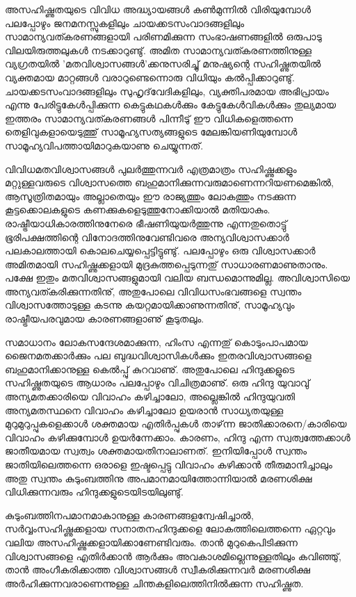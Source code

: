 ﻿

\vskip 2pt

അസഹിഷ്ണുതയുടെ വിവിധ അദ്ധ്യായങ്ങള്‍ കണ്‍മുന്നില്‍ വിരിയുമ്പോള്‍ പലപ്പോഴും ജനമനസ്സുകളിലും ചായക്കടസംവാദങ്ങളിലും 
സാമാന്യവത്കരണങ്ങളായി പരിണമിക്കുന്ന സംഭാഷണങ്ങളില്‍ ഒരുപാടു വിലയിരുത്തലുകള്‍ നടക്കാറുണ്ടു്. അമിത സാമാന്യവത്കരണത്തിനുള്ള
 വ്യഗ്രതയില്‍ 'മതവിശ്വാസങ്ങള്‍'ക്കനുസരിച്ചു് മനുഷ്യന്റെ സഹിഷ്ണുതയില്‍ വ്യക്തമായ മാറ്റങ്ങള്‍ വരാറുണ്ടെന്നൊരു വിധിയും കല്‍പ്പിക്കാറുണ്ടു്. 
 ചായക്കടസംവാദങ്ങളിലും സുഹൃദ്‌വേദികളിലും, വ്യക്തിപരമായ അഭിപ്രായം എന്നു പേരിട്ടുകേള്‍പ്പിക്കുന്ന കെട്ടുകഥകള്‍ക്കും കേട്ടുകേള്‍വികള്‍ക്കും
  തുല്യമായ ഇത്തരം സാമാന്യവത്കരണങ്ങള്‍ പിന്നീടു് ഈ വിധികളെത്തന്നെ തെളിവുകളായെടുത്തു് സാമൂഹ്യസത്യങ്ങളുടെ 
  മേലങ്കിയണിയുമ്പോള്‍ സാമൂഹ്യവിപത്തായിമാറുകയാണു ചെയ്യുന്നത്.

വിവിധമതവിശ്വാസങ്ങള്‍ പുലര്‍ത്തുന്നവര്‍ എത്രമാത്രം സഹിഷ്ണുക്കളും മറ്റുള്ളവരുടെ വിശ്വാസത്തെ ബഹുമാനിക്കുന്നവരുമാണെന്നറിയണമെങ്കില്‍, 
ആസൂത്രിതമായും അല്ലാതെയും ഈ രാജ്യത്തും ലോകത്തും നടക്കുന്ന കൂട്ടക്കൊലകളുടെ കണക്കുകളെടുത്തുനോക്കിയാല്‍ മതിയാകും. 
രാഷ്ട്രീയാധികാരത്തിനുനേരെ ഭീഷണിയുയര്‍ത്തുന്നു എന്നതുതൊട്ടു് ഭൂരിപക്ഷത്തിന്റെ വിനോദത്തിനുവേണ്ടിവരെ അന്യവിശ്വാസക്കാര്‍ 
പലകാലത്തായി കൊലചെയ്യപ്പെട്ടിട്ടുണ്ടു്. പലപ്പോഴും ഒരു വിശ്വാസക്കാര്‍ അമിതമായി സഹിഷ്ണുക്കളായി മുദ്രകുത്തപ്പെടുന്നതു് സാധാരണമാണുതാനും. 
പക്ഷേ ഇതും മതവിശ്വാസങ്ങളുമായി വലിയ ബന്ധമൊന്നുമില്ല. അവിശ്വാസിയെ അന്യവത്കരിക്കുന്നതിനു്, അതുപോലെ 
വിവിധസംഭവങ്ങളെ സ്വന്തം വിശ്വാസത്തോടുള്ള കടന്നു കയറ്റമായിക്കാണുന്നതിനു്, സാമൂഹ്യവും രാഷ്ട്രീയപരവുമായ കാരണങ്ങളാണു് കൂടുതലും.

സമാധാനം ലോകസന്ദേശമാക്കുന്ന, ഹിംസ എന്നതു് കൊടുംപാപമായ ജൈനമതക്കാര്‍ക്കും പല ബുദ്ധവിശ്വാസികള്‍ക്കും 
ഇതരവിശ്വാസങ്ങളെ ബഹുമാനിക്കാനുള്ള കെല്‍പ്പു് കുറവാണു്. അതുപോലെ ഹിന്ദുക്കളുടെ സഹിഷ്ണുതയുടെ ആധാരം പലപ്പോഴും 
വിചിത്രമാണു്. ഒരു ഹിന്ദു യുവാവു് അന്യമതക്കാരിയെ വിവാഹം കഴിച്ചാലോ, അല്ലെങ്കില്‍ ഹിന്ദുയുവതി അന്യമതസ്ഥനെ വിവാഹം 
കഴിച്ചാലോ ഉയരാന്‍ സാധ്യതയുള്ള മുറുമുറുപ്പുകളെക്കാള്‍ ശക്തമായ എതിര്‍പ്പുകള്‍ താഴ്‌ന്ന ജാതിക്കാരനെ/കാരിയെ വിവാഹം 
കഴിക്കുമ്പോള്‍ ഉയര്‍ന്നേക്കാം. കാരണം, ഹിന്ദു എന്ന സ്വത്വത്തേക്കാള്‍ ജാതീയമായ സ്വത്വം ശക്തമായതിനാലാണത്. 
ഇനിയിപ്പോള്‍ സ്വന്തം ജാതിയിലെത്തന്നെ ഒരാളെ ഇഷ്ടപ്പെട്ടു വിവാഹം കഴിക്കാന്‍ തീരുമാനിച്ചാലും അതു സ്വന്തം 
കുടുംബത്തിനു അപമാനമായിത്തോന്നിയാല്‍ മരണശിക്ഷ വിധിക്കുന്നവരും ഹിന്ദുക്കളുടെയിടയിലുണ്ടു്.

കുടുംബത്തിനപമാനമാകാനുള്ള കാരണങ്ങളന്വേഷിച്ചാല്‍, സര്‍വ്വംസഹിഷ്ണുക്കളായ സനാതനഹിന്ദുക്കളെ ലോകത്തിലെത്തന്നെ
 ഏറ്റവും വലിയ അസഹിഷ്ണുക്കളായിക്കാണേണ്ടിവരും. താന്‍ മുറുകെപിടിക്കുന്ന വിശ്വാസങ്ങളെ എതിര്‍ക്കാന്‍ ആര്‍ക്കും അവകാശമില്ലെന്നുള്ളതിലും 
 കവിഞ്ഞു്, താന്‍ അംഗീകരിക്കാത്ത വിശ്വാസങ്ങള്‍ സ്വീകരിക്കുന്നവര്‍ മരണശിക്ഷ അര്‍ഹിക്കുന്നവരാണെന്നുള്ള 
 ചിന്തകളിലെത്തിനില്‍ക്കുന്ന സഹിഷ്ണുത.

